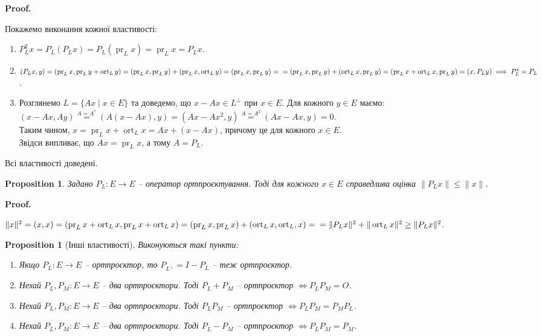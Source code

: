 \documentclass[a4paper, 10pt]{article}
\makeatletter
\theoremstyle{theoremdd}
\newtheorem{proposition}[theorem]{Proposition}
\DeclareMathOperator{\ort}{ort}
\DeclareMathOperator{\pr}{pr}
\renewenvironment{proof}[1][Proof.\\]{\par
\pushQED{\hfill \qed}%
\normalfont \topsep6\p@\@plus6\p@\relax
\trivlist
\item\relax
{\bfseries
#1\@addpunct{.}}\hspace\labelsep\ignorespaces
}{%
\popQED\endtrivlist\@endpefalse
}
\makeatother
\begin{document}
\begin{proof}
Покажемо виконання кожної властивості:
\begin{enumerate}[wide=0pt,label={\arabic*)}]
\item $P^2_L x = P_L (P_L x) = P_L (\pr_L x) = \pr_L x = P_L x$.

\item $(P_L x, y) = (\pr_L x, \pr_L y + \ort_L y) = (\pr_L x,\pr_L y) + (\pr_L x,\ort_L y) = (\pr_L x,\pr_L y) =\\ = (\pr_L x, \pr_L y) + (\ort_L x, \pr_L y) = (\pr_L x + \ort_L x, \pr_L y) = (x, P_L y) \implies P^*_L = P_L$.

\item Розглянемо $L = \{Ax \mid x \in E\}$ та доведемо, що $x - Ax \in L^\perp$ при $x \in E$. Для кожного $y \in E$ маємо:\\
$(x-Ax,Ay) \overset{A = A^*}{=} (A(x-Ax),y) = (Ax-Ax^2,y) \overset{A = A^2}{=} (Ax-Ax,y) = 0$.\\
Таким чином, $x = \pr_L x + \ort_L x = Ax + (x - Ax)$, причому це для кожного $x \in E$.\\
Звідси випливає, що $Ax = \pr_L x$, а тому $A = P_L$.
\end{enumerate}
Всі властивості доведені.
\end{proof}

\begin{proposition}
Задано $P_L \colon E \to E$ -- оператор ортпроєктування. Тоді для кожного $x \in E$ справедлива оцінка $\|P_L x\| \leq \|x\|$.
\end{proposition}

\begin{proof}
$\|x\|^2 = (x,x) = (\pr_L x + \ort_L x, \pr_L x + \ort_L x) = (\pr_L x, \pr_L x) + (\ort_L x, \ort_L, x) = \\ = \|P_L x\|^2 + \|\ort_L x\|^2 \geq \|P_L x\|^2$.
\end{proof}

\begin{proposition}[Інші властивості]
Виконуються такі пункти:
\begin{enumerate}[nosep,wide=0pt,label={\arabic*)}]
\item Якщо $P_L \colon E \to E$ -- ортпроєктор, то $P_{L^{\perp}} = I - P_L$ -- теж ортпроєктор.
\item Нехай $P_L, P_M \colon E \to E$ -- два ортпроєктори. Тоді $P_L + P_M$ -- ортпроєктор $\iff P_L P_M = O$.
\item Нехай $P_L, P_M \colon E \to E$ -- два ортпроєктори. Тоді $P_L P_M$ -- ортпроєктор $\iff P_L P_M = P_M P_L$.
\item Нехай $P_L, P_M \colon E \to E$ -- два ортпроєктори. Тоді $P_L - P_M$ -- ортпроєктор $\iff P_L P_M = P_M$.
\end{enumerate}
\end{proposition}
\end{document}
